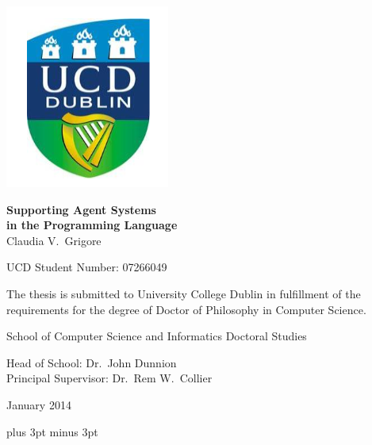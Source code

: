 \documentclass[a4paper,12pt,oneside,fleqn]{book} %
\begin{document}
\frontmatter


\begin{titlepage}
\begin{center}

\includegraphics{ucd2.png}

\bigskip\bigskip
{\huge\bf Supporting Agent Systems \\[.5ex] 
  in the Programming Language}
\\[3ex]
{\Large Claudia V.~Grigore}

UCD Student Number: 07266049

\bigskip\bigskip
The thesis is submitted to University College Dublin
in fulfillment of the requirements for the degree of
Doctor of Philosophy in Computer Science.

\bigskip
School of Computer Science and Informatics Doctoral Studies

\bigskip
Head of School: Dr.~John Dunnion\\
Principal Supervisor: Dr.~Rem W.~Collier\\
\bigskip\bigskip

January 2014
\end{center}
\end{titlepage}


\tableofcontents
\listoffigures
\listoftables
\baselineskip=21.75pt
\parskip=3pt plus 3pt minus 3pt
%
\end{document}
